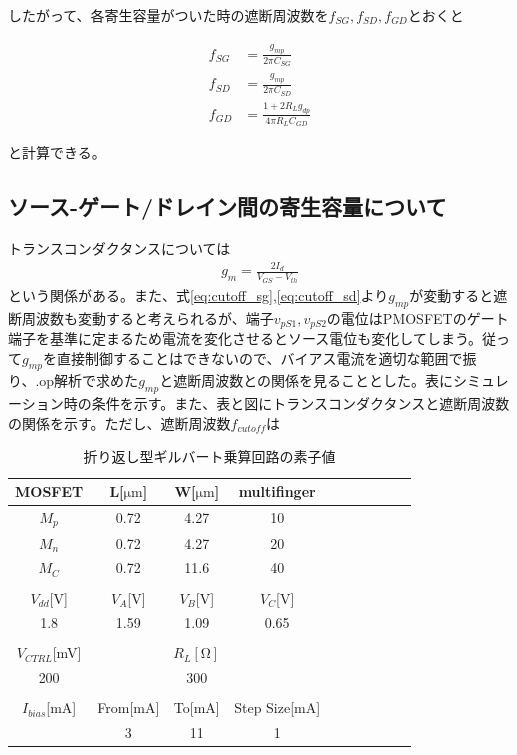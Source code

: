 \documentclass[twocolumn]{jsarticle}
\begin{document}
したがって、各寄生容量がついた時の遮断周波数を$f_{SG},f_{SD},f_{GD}$とおくと

\begin{align}
    f_{SG} &= \frac{g_{mp}}{2\pi C_{SG}}    \label{eq:cutoff_sg}\\
    f_{SD} &= \frac{g_{mp}}{2\pi C_{SD}}    \label{eq:cutoff_sd}\\
    f_{GD} &= \frac{1+2R_{L}g_{dp}}{4\pi R_{L}C_{GD}}      \label{eq:cutoff_gd}
\end{align}

と計算できる。

\subsection{ソース-ゲート/ドレイン間の寄生容量について}
    トランスコンダクタンスについては
    \begin{align*}
        g_{m}=\frac{2I_{d}}{V_{GS}-V_{th}}
    \end{align*}
    という関係がある。また、式\eqref{eq:cutoff_sg},\eqref{eq:cutoff_sd}より$g_{mp}$が変動すると遮断周波数も変動すると考えられるが、端子$v_{pS1},v_{pS2}$の電位はPMOSFETのゲート端子を基準に定まるため電流を変化させるとソース電位も変化してしまう。従って$g_{mp}$を直接制御することはできないので、バイアス電流を適切な範囲で振り、.op解析で求めた$g_{mp}$と遮断周波数との関係を見ることとした。表にシミュレーション時の条件を示す。また、表と図にトランスコンダクタンスと遮断周波数の関係を示す。ただし、遮断周波数$f_{cutoff}$は

    \begin{table}[h]
        \caption{折り返し型ギルバート乗算回路の素子値}
        \label{table:sim_s_g/d}
        \centering
        \begin{tabular}{cccccccccc}
            MOSFET & L[$\mathrm{\mu m}$] & W[$\mathrm{\mu m}$] & multifinger\\
            \hline \hline
            $M_{p}$ & 0.72 & 4.27 & 10 \\
            $M_{n}$ & 0.72 & 4.27 & 20 \\
            $M_{C}$ & 0.72 & 11.6 & 40 \\
            &&&\\
            $V_{dd}$[V] & $V_{A}$[V] & $V_{B}$[V] & $V_{C}$[V]\\
            \hline\hline
            1.8 & 1.59 & 1.09 & 0.65 \\
            &&&\\
             $V_{CTRL}$[mV] & & $R_{L}[\mathrm{\Omega}]$ & \\
            \hline\hline
            200 & & 300 &\\
            &&&\\
            $I_{bias}$[mA] & From[mA] & To[mA] & Step Size[mA]\\
            \hline\hline
            & 3 & 11 & 1
        \end{tabular}
    \end{table}
\end{document}
